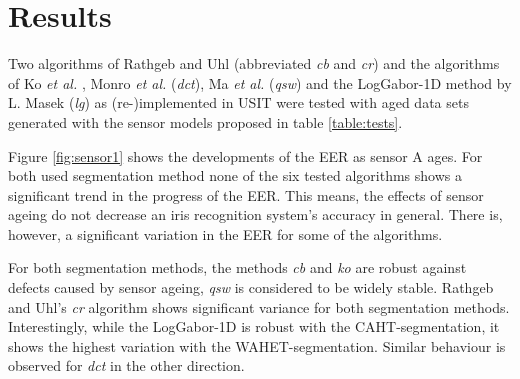 \documentclass[10pt,twocolumn,letterpaper]{article}
\providecommand{\etal}[0]{\textit{et al.} }
\begin{document}
 \section{Results}
 \label{results}
 Two algorithms of Rathgeb and Uhl (abbreviated \emph{cb} and \emph{cr}) 
 and the algorithms of Ko \etal,
Monro \etal (\emph{dct}),
 Ma \etal(\emph{qsw})
  and the LogGabor-1D method by L. Masek (\emph{lg}) as (re-)implemented in USIT were tested with aged data sets generated with the sensor models proposed in table \ref{table:tests}.
 
 Figure \ref{fig:sensor1} shows the developments of the EER as sensor A ages. For both used segmentation method none of the six tested algorithms shows a significant trend in the progress of the EER. This means, the effects of sensor ageing do not decrease an iris recognition system's accuracy in general. There is, however, a significant variation in the EER for some of the algorithms. 
  
For both segmentation methods, the methods \emph{cb} and \emph{ko} are robust against defects caused by sensor ageing, \emph{qsw} is considered to be widely stable. Rathgeb and Uhl's \emph{cr} algorithm shows significant variance for both segmentation methods. Interestingly, while the LogGabor-1D is robust with the CAHT-segmentation, it shows the highest variation with the WAHET-segmentation. Similar behaviour is observed for \emph{dct} in the other direction.
\end{document}
